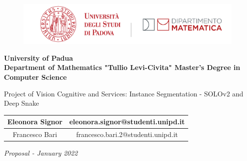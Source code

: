 \documentclass[10pt,a4paper, italian]{article}
\begin{document}
\begin{figure}[H]
\centering
  \includegraphics[width=0.6\linewidth]{./img/logo_dip.png}
   \label{fig: logo-unip-dipartimento-matematica}
\end{figure}
\vspace{1cm}
\begin{center}\Large{\textbf{University of Padua \\ Department of Mathematics "Tullio Levi-Civita" Master's Degree in Computer Science}}\end{center}
\vspace{5cm}
\begin{center}\Large{Project of Vision Cognitive and Services: Instance Segmentation - SOLOv2 and Deep Snake\\ }\end{center}
\begin{flushright} 
\vspace{1cm}

\begin{table}[h]
\begin{center}
\begin{tabular}{|c|c|}
\hline
Eleonora Signor & eleonora.signor@studenti.unipd.it\\
\hline
Francesco Bari & francesco.bari.2@studenti.unipd.it \\
\hline
\end{tabular}
\end{center}
\end{table}

\vspace{4cm}
\textit{Proposal - January 2022}\\
\end{flushright}
\pagebreak

\setcounter{section}{0}
\setcounter{page}{1}
\newpage
\end{document}
